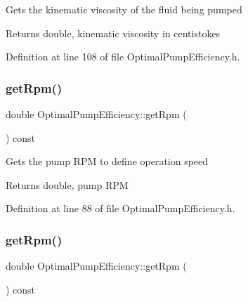 Gets the kinematic viscosity of the fluid being pumped

\begin{DoxyReturn}{Returns}
double, kinematic viscosity in centistokes 
\end{DoxyReturn}


Definition at line 108 of file Optimal\+Pump\+Efficiency.\+h.

\mbox{\label{class_optimal_pump_efficiency_a58e8a430ced612e0518abd07fb30b085}} 
\subsubsection{\texorpdfstring{get\+Rpm()}{getRpm()}\hspace{0.1cm}{\footnotesize\ttfamily [1/3]}}
{\footnotesize\ttfamily double Optimal\+Pump\+Efficiency\+::get\+Rpm (\begin{DoxyParamCaption}{ }\end{DoxyParamCaption}) const\hspace{0.3cm}{\ttfamily [inline]}}

Gets the pump R\+PM to define operation speed

\begin{DoxyReturn}{Returns}
double, pump R\+PM 
\end{DoxyReturn}


Definition at line 88 of file Optimal\+Pump\+Efficiency.\+h.

\mbox{\label{class_optimal_pump_efficiency_a58e8a430ced612e0518abd07fb30b085}} 
\subsubsection{\texorpdfstring{get\+Rpm()}{getRpm()}\hspace{0.1cm}{\footnotesize\ttfamily [2/3]}}
{\footnotesize\ttfamily double Optimal\+Pump\+Efficiency\+::get\+Rpm (\begin{DoxyParamCaption}{ }\end{DoxyParamCaption}) const\hspace{0.3cm}{\ttfamily [inline]}}


